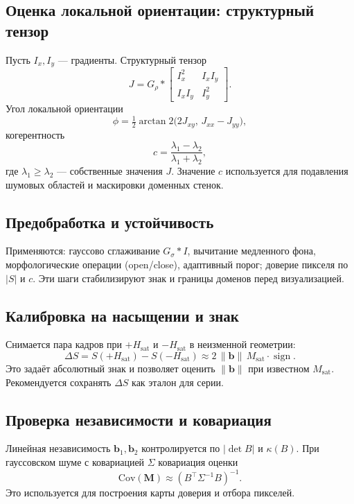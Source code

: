 \documentclass[12pt,a4paper]{article}
\numberwithin{equation}{section}
\begin{document}
\subsection{Оценка локальной ориентации: структурный тензор}
Пусть \(I_x,I_y\) — градиенты. Структурный тензор
\begin{equation}
 J = G_\rho * 
 \begin{bmatrix}
 I_x^2 & I_x I_y\\
 I_x I_y & I_y^2
 \end{bmatrix}.
\end{equation}
Угол локальной ориентации
\begin{equation}
 \phi = \tfrac12 \arctan2\!\big(2J_{xy},\, J_{xx}-J_{yy}\big),
\end{equation}
когерентность 
\begin{equation}
 c=\frac{\lambda_1-\lambda_2}{\lambda_1+\lambda_2},
\end{equation}
где \(\lambda_1\ge\lambda_2\) — собственные значения \(J\). Значение \(c\) используется для подавления шумовых областей и маскировки доменных стенок.

\subsection{Предобработка и устойчивость}
Применяются: гауссово сглаживание \(G_\sigma * I\), вычитание медленного фона, морфологические операции (open/close), адаптивный порог; доверие пикселя по \(|S|\) и \(c\). Эти шаги стабилизируют знак и границы доменов перед визуализацией.

\subsection{Калибровка на насыщении и знак}
Снимается пара кадров при \(+H_{\text{sat}}\) и \(-H_{\text{sat}}\) в неизменной геометрии:
\begin{equation}
 \Delta S = S(+H_{\text{sat}})-S(-H_{\text{sat}}) \approx 2\,\|\mathbf b\|\,M_{\text{sat}}\cdot \operatorname{sign}.
\end{equation}
Это задаёт абсолютный знак и позволяет оценить \(\|\mathbf b\|\) при известном \(M_{\text{sat}}\). Рекомендуется сохранять \(\Delta S\) как эталон для серии.

\subsection{Проверка независимости и ковариация}
Линейная независимость \(\mathbf b_1,\mathbf b_2\) контролируется по \(|\det B|\) и \(\kappa(B)\). При гауссовском шуме с ковариацией \(\Sigma\) ковариация оценки
\begin{equation}
 \mathrm{Cov}(\mathbf M) \approx (B^\top \Sigma^{-1} B)^{-1}.
\end{equation}
Это используется для построения карты доверия и отбора пикселей.
\end{document}
